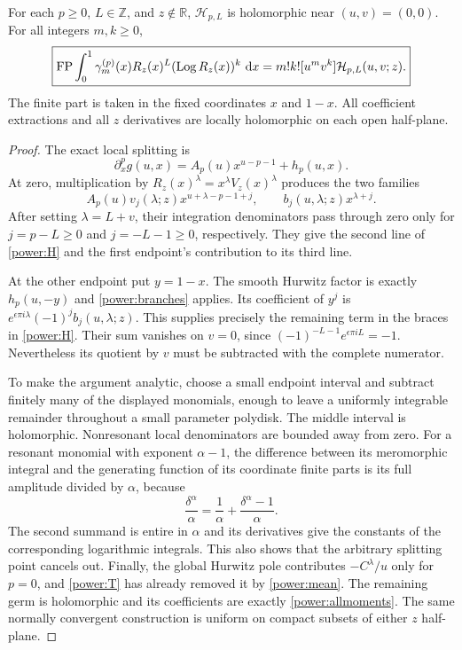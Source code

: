 \begin{theorem}\label{power:completion}
For each $p\ge0$, $L\in\mathbb Z$, and $z\notin\mathbb R$,
$\mathcal H_{p,L}$ is holomorphic near $(u,v)=(0,0)$.
For all integers $m,k\ge0$,
\begin{equation}\label{power:allmoments}
 \boxed{\displaystyle
 \operatorname{FP}\int_0^1\gamma_m^{(p)}(x)R_z(x)^L
                    (\operatorname{Log} R_z(x))^k\,\mathop{}\!\mathrm{d} x
       =m!k![u^mv^k]\mathcal H_{p,L}(u,v;z).}
\end{equation}
The finite part is taken in the fixed coordinates $x$ and $1-x$.
All coefficient extractions and all $z$ derivatives are locally
holomorphic on each open half-plane.
\end{theorem}

\begin{proof}
The exact local splitting is
\[
 \partial_x^p g(u,x)=A_p(u)x^{u-p-1}+h_p(u,x).
\]
At zero, multiplication by $R_z(x)^\lambda=x^\lambda V_z(x)^\lambda$
produces the two families
\[
 A_p(u)v_j(\lambda;z)x^{u+\lambda-p-1+j},\qquad
 b_j(u,\lambda;z)x^{\lambda+j}.
\]
After setting $\lambda=L+v$, their integration denominators pass
through zero only for $j=p-L\ge0$ and $j=-L-1\ge0$, respectively.
They give the second line of \eqref{power:H} and the first endpoint's
contribution to its third line.

At the other endpoint put $y=1-x$.  The smooth Hurwitz factor is
exactly $h_p(u,-y)$ and \eqref{power:branches} applies.  Its
coefficient of $y^j$ is
$e^{\epsilon\pi i\lambda}(-1)^jb_j(u,\lambda;z)$.
This supplies precisely the remaining term in the braces in
\eqref{power:H}.  Their sum vanishes on $v=0$, since
$(-1)^{-L-1}e^{\epsilon\pi iL}=-1$.  Nevertheless its quotient by
$v$ must be subtracted with the complete numerator.

To make the argument analytic, choose a small endpoint interval and
subtract finitely many of the displayed monomials, enough to leave
a uniformly integrable remainder throughout a small parameter
polydisk.  The middle interval is holomorphic.  Nonresonant local
denominators are bounded away from zero.  For a resonant monomial
with exponent $\alpha-1$, the difference between its meromorphic
integral and the generating function of its coordinate finite parts
is its full amplitude divided by $\alpha$, because
\[
 \frac{\delta^\alpha}{\alpha}
 =\frac1\alpha+\frac{\delta^\alpha-1}{\alpha}.
\]
The second summand is entire in $\alpha$ and its derivatives give
the constants of the corresponding logarithmic integrals.  This
also shows that the arbitrary splitting point cancels out.  Finally,
the global Hurwitz pole contributes $-C^\lambda/u$ only for $p=0$,
and \eqref{power:T} has already removed it by \eqref{power:mean}.
The remaining germ is holomorphic and its coefficients are exactly
\eqref{power:allmoments}.  The same normally convergent construction
is uniform on compact subsets of either $z$ half-plane.
\end{proof}

